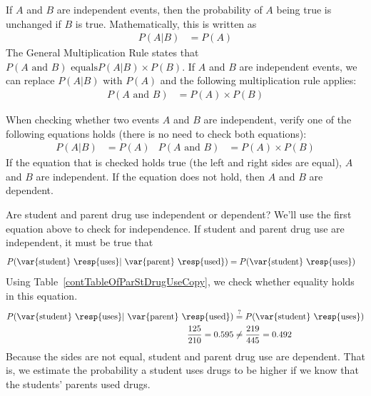 If $A$ and $B$ are independent events, then the probability of $A$ being true is unchanged if $B$ is true. Mathematically, this is written as
\begin{align*}
P(A|B) &= P(A)
\end{align*}
The General Multiplication Rule states that $P(A\text{ and }B) \text{ equals}P(A | B)\times P(B)$. If $A$ and $B$ are independent events, we can replace $P(A|B)$ with $P(A)$ and the following multiplication rule applies:
\begin{align*}
P(A\text{ and }B) &= P(A)\times P(B)
\end{align*}

\begin{tipBox}{
When checking whether two events $A$ and $B$ are independent, verify one of the following equations holds (there is no need to check both equations):
\begin{align*}
P(A|B) &= P(A)&
P(A\text{ and }B) &= P(A)\times P(B)
\end{align*}
If the equation that is checked holds true (the left and right sides are equal), $A$ and $B$ are independent. If the equation does not hold, then $A$ and $B$ are dependent.}
\end{tipBox}

\begin{example}{Are student and parent drug use independent or dependent?}\label{studentParentDrugUseIndependentExample}
We'll use the first equation above to check for independence. If student and parent drug use are independent, it must be true that
\begin{align*}
P(\text{\var{student} \resp{uses}} | \text{ \var{parent} \resp{used}}) &= P(\text{\var{student} \resp{uses}})
\end{align*}
Using Table~\ref{contTableOfParStDrugUseCopy}, we check whether equality holds in this equation.
\begin{align*}
P(\text{\var{student} \resp{uses}} | \text{ \var{parent} \resp{used}}) &\overset{?}{=} P(\text{\var{student} \resp{uses}}) \\
\frac{125}{210}=0.595 &\neq \frac{219}{445}=0.492
\end{align*}
Because the sides are not equal, student and parent drug use are dependent. That is, we estimate the probability a student uses drugs to be higher if we know that the students' parents used drugs.
\end{example}


